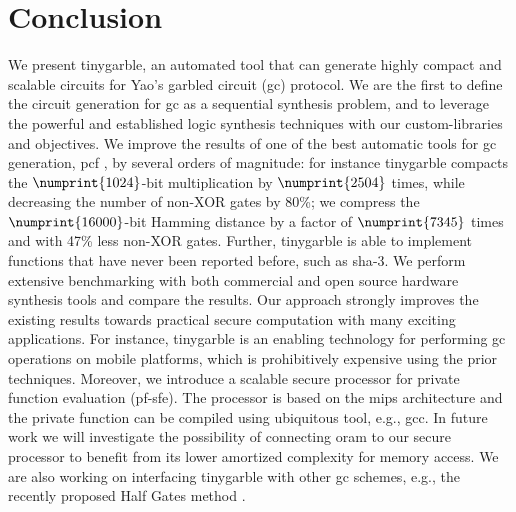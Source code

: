\chapter{Conclusion}\label{chap:conclusion}
We present \gls{tinygarble}, an automated tool that can generate highly compact and scalable circuits for Yao's garbled circuit (\acrshort{gc}) protocol.
We are the first to define the circuit generation for \acrshort{gc} as a sequential synthesis problem, and to leverage the powerful and established logic synthesis techniques with our custom-libraries and objectives.
We improve the results of one of the best automatic tools for \acrshort{gc} generation, \gls{pcf} \cite{kreuter2013pcf}, by several orders of magnitude: for instance \gls{tinygarble} compacts the $\numprint{1024}$-bit multiplication by $\numprint{2504}$ times, while decreasing the number of non-XOR gates by 80\%; we compress the $\numprint{16000}$-bit Hamming distance by a factor of $\numprint{7345}$ times and with 47\% less non-XOR gates.
Further, \gls{tinygarble} is able to implement functions that have never been reported before, such as \acrshort{sha}-3.
We perform extensive benchmarking with both commercial and open source hardware synthesis tools and compare the results.
Our approach strongly improves the existing results towards practical secure computation with many exciting applications.
For instance, \gls{tinygarble} is an enabling technology for performing \acrshort{gc} operations on mobile platforms, which is prohibitively expensive using the prior techniques.
Moreover, we introduce a scalable secure processor for private function evaluation (\acrshort{pf-sfe}).
The processor is based on the \gls{mips} architecture and the private function can be compiled using ubiquitous tool, e.g., gcc.
In future work we will investigate the possibility of connecting \acrfull{oram} to our secure processor to benefit from its lower amortized complexity for memory access.
We are also working on interfacing \gls{tinygarble} with other \acrshort{gc} schemes, e.g., the recently proposed Half Gates method \cite{zahur2015two}.

